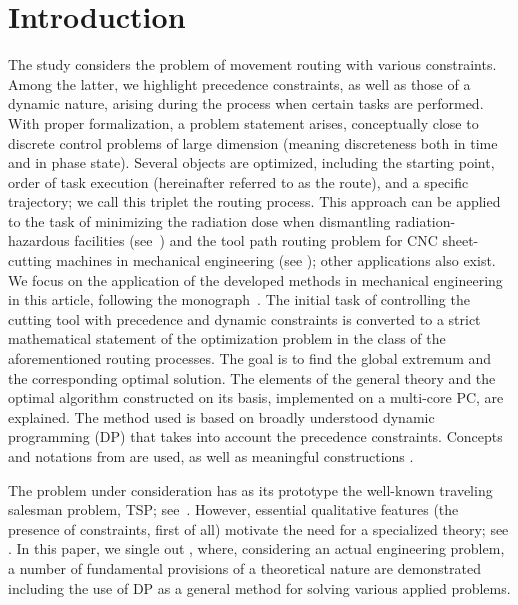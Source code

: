 \documentclass[numbers,sort&compress]{IntechOpen-Book}%
\begin{document}
\section{Introduction}
\label{sec:intro}

The study considers the problem of movement routing
with various constraints.
Among the latter, we highlight
precedence constraints,
as well as those of a dynamic nature,
arising during the process when certain tasks are performed.
With proper formalization, a problem statement arises,
conceptually close to discrete control problems of large dimension
(meaning discreteness both in time and in phase state).
Several objects are optimized,
including the starting point,
order of task execution
(hereinafter referred to as the route),
and a specific trajectory;
we call this triplet
the routing process.
This approach can be applied
to the task of minimizing the radiation dose 
when dismantling radiation-hazardous facilities
(see~\cite {1,3})
and the tool path routing problem
for CNC sheet-cutting machines
in mechanical engineering (see \cite {4,5});
other applications also exist.
We focus on the application of the developed methods in mechanical engineering
in this article,
following the monograph~\cite{4}.
The initial task of controlling the cutting tool
with precedence and dynamic constraints
is converted to a strict mathematical statement of
the optimization problem
in the class of the aforementioned routing processes.
The goal is to find
the global extremum and the corresponding optimal solution.
The elements of the general theory and
the optimal algorithm constructed on its basis,
implemented on a multi-core PC,
are explained.
The method used is based on
broadly understood dynamic programming
(DP)
that takes into account the precedence constraints.
Concepts and notations from
\cite[part II]{4}
are used,
as well as
meaningful constructions
\cite[part I]{4}.

The problem under consideration
has as its prototype the well-known
traveling salesman problem,
TSP;
see~\cite{7,8,9,10,11,12}.
However, essential qualitative features
(the presence of constraints, first of all)
motivate the need for a specialized theory;
see \cite {1,3,4,5,14}.
In this paper,
we single out \cite{4},
where, considering an actual engineering problem,
a number of fundamental provisions of a theoretical nature
are demonstrated including the use of DP
as a general method for solving various applied problems.
\end{document}
